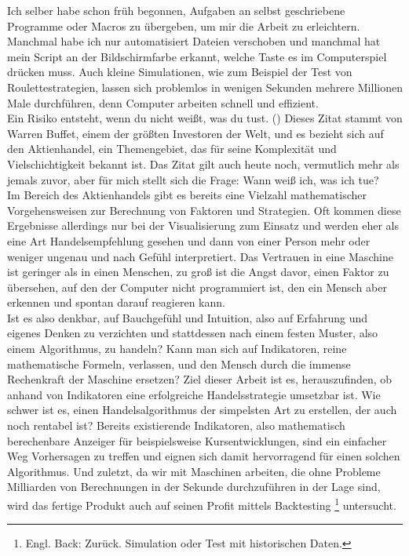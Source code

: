 \documentclass[12pt]{article}
\begin{document}
	Ich selber habe schon früh begonnen, Aufgaben an selbst geschriebene Programme oder Macros zu übergeben, um mir die Arbeit zu erleichtern. Manchmal habe ich nur automatisiert Dateien verschoben und manchmal hat mein Script an der Bildschirmfarbe erkannt, welche Taste es im Computerspiel drücken muss. Auch kleine Simulationen, wie zum Beispiel der Test von Roulettestrategien, lassen sich problemlos in wenigen Sekunden mehrere Millionen Male durchführen, denn Computer arbeiten schnell und effizient.\\
	\glqq Ein Risiko entsteht, wenn du nicht weißt, was du tust. \grqq{} (\cite{ChristophRottwilm}) Dieses Zitat stammt von Warren Buffet, einem der größten Investoren der Welt, und es bezieht sich auf den Aktienhandel, ein Themengebiet, das für seine Komplexität und Vielschichtigkeit bekannt ist. Das Zitat gilt auch heute noch, vermutlich mehr als jemals zuvor, aber für mich stellt sich die Frage: Wann weiß ich, was ich tue?\\
	Im Bereich des Aktienhandels gibt es bereits eine Vielzahl mathematischer Vorgehensweisen zur Berechnung von Faktoren und Strategien. Oft kommen diese Ergebnisse allerdings nur bei der Visualisierung zum Einsatz und werden eher als eine Art Handelsempfehlung gesehen und dann von einer Person mehr oder weniger ungenau und nach Gefühl interpretiert. Das Vertrauen in eine Maschine ist geringer als in einen Menschen, zu groß ist die Angst davor, einen Faktor zu übersehen, auf den der Computer nicht programmiert ist, den ein Mensch aber erkennen und spontan darauf reagieren kann.\\
	Ist es also denkbar, auf Bauchgefühl und Intuition, also auf Erfahrung und eigenes Denken zu verzichten und stattdessen nach einem festen Muster, also einem Algorithmus, zu handeln? Kann man sich auf Indikatoren, reine mathematische Formeln, verlassen, und den Mensch durch die immense Rechenkraft der Maschine ersetzen? Ziel dieser Arbeit ist es, herauszufinden, ob anhand von Indikatoren eine erfolgreiche Handelsstrategie umsetzbar ist. Wie schwer ist es, einen Handelsalgorithmus der simpelsten Art zu erstellen, der auch noch rentabel ist? Bereits existierende Indikatoren, also mathematisch berechenbare Anzeiger für beispielsweise Kursentwicklungen, sind ein einfacher Weg Vorhersagen zu treffen und eignen sich damit hervorragend für einen solchen Algorithmus. Und zuletzt, da wir mit Maschinen arbeiten, die ohne Probleme Milliarden von Berechnungen in der Sekunde durchzuführen in der Lage sind, wird das fertige Produkt auch auf seinen Profit mittels Backtesting \footnote{Engl. Back: Zurück. Simulation oder Test mit historischen Daten.} untersucht.
\end{document}
